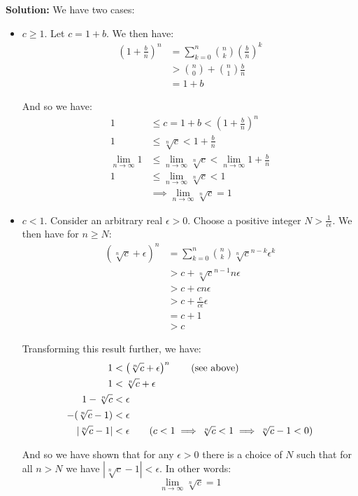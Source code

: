 \documentclass{article}
\begin{document}
\noindent\textbf{Solution:} We have two cases:
\begin{itemize}
  \item $c\ge 1$. Let $c=1+b$. We then have:
  \begin{align*}
    \left(1+\frac{b}{n}\right)^n&=\sum_{k=0}^n\binom{n}{k}\left(\frac{b}{n}\right)^k\tag{binomial theorem}\\
    &>\binom{n}{0}+\binom{n}{1}\frac{b}{n}\tag{first 2 terms}\\
    &=1+b
  \end{align*}

  And so we have:
  \begin{align*}
    1&\le c=1+b<\left(1+\frac{b}{n}\right)^n\tag{see above}\\
    1&\le \sqrt[n]{c}<1+\frac{b}{n}\tag{$n$th root, all sides positive}\\
    \lim_{n\to\infty}1&\le\lim_{n\to\infty}\sqrt[n]{c}<\lim_{n\to\infty}1+\frac{b}{n}\tag{squeeze theorem}\\
    1&\le\lim_{n\to\infty}\sqrt[n]{c}<1\\
    &\implies\lim_{n\to\infty}\sqrt[n]{c}=1
  \end{align*}

  \item $c<1$. Consider an arbitrary real $\epsilon>0$. Choose a positive integer $N>\frac{1}{c\epsilon}$. We then have for $n\ge N$:
  \begin{align*}
    \left(\sqrt[n]{c}+\epsilon\right)^n&=\sum_{k=0}^n\binom{n}{k}\sqrt[n]{c}^{n-k}\epsilon^k\tag{binomial theorem}\\
    &>c+\sqrt[n]{c}^{n-1}n\epsilon\tag{first two terms}\\
    &>c+cn\epsilon\\
    &>c+\frac{c}{c\epsilon}\epsilon\\
    &=c+1\\
    &>c
  \end{align*}

  Transforming this result further, we have:
  \begin{align*}
    1&<\left(\sqrt[n]{c}+\epsilon\right)^n\tag{see above}\\
    1&<\sqrt[n]{c}+\epsilon\\
    1-\sqrt[n]{c}&<\epsilon\\
    -(\sqrt[n]{c}-1)&<\epsilon\\
    |\sqrt[n]{c}-1|&<\epsilon\tag{$c<1\implies\sqrt[n]{c}<1\implies\sqrt[n]{c}-1<0$}
  \end{align*}

  And so we have shown that for any $\epsilon>0$ there is a choice of $N$ such that for all $n>N$ we have $|\sqrt[n]{c}-1|<\epsilon$. In other words:
  \begin{equation*}
    \lim_{n\to\infty}\sqrt[n]{c}=1
  \end{equation*}
\end{itemize}
\end{document}
